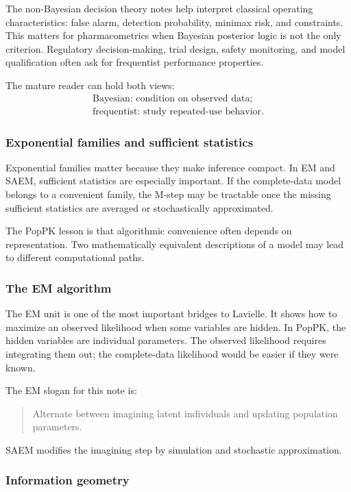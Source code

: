 The non-Bayesian decision theory notes help interpret classical operating characteristics: false alarm, detection probability, minimax risk, and constraints.  This matters for pharmacometrics when Bayesian posterior logic is not the only criterion.  Regulatory decision-making, trial design, safety monitoring, and model qualification often ask for frequentist performance properties.

The mature reader can hold both views:
\[
  \begin{array}{c}
    \text{Bayesian: condition on observed data;}\\
    \text{frequentist: study repeated-use behavior.}
  \end{array}
\]

\subsubsection*{Exponential families and sufficient statistics}

Exponential families matter because they make inference compact.  In EM and SAEM, sufficient statistics are especially important.  If the complete-data model belongs to a convenient family, the M-step may be tractable once the missing sufficient statistics are averaged or stochastically approximated.

The PopPK lesson is that algorithmic convenience often depends on representation.  Two mathematically equivalent descriptions of a model may lead to different computational paths.

\subsubsection*{The EM algorithm}

The EM unit is one of the most important bridges to Lavielle.  It shows how to maximize an observed likelihood when some variables are hidden.  In PopPK, the hidden variables are individual parameters.  The observed likelihood requires integrating them out; the complete-data likelihood would be easier if they were known.

The EM slogan for this note is:
\begin{quote}
  Alternate between imagining latent individuals and updating population parameters.
\end{quote}
SAEM modifies the imagining step by simulation and stochastic approximation.

\subsubsection*{Information geometry}

